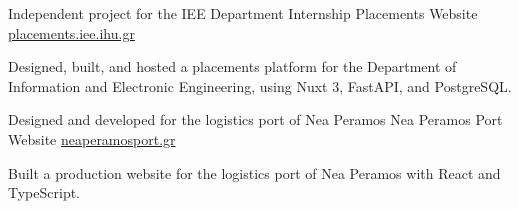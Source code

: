 

\begin{cventries}

  \cventry
    {Independent project for the IEE Department} %
    {Internship Placements Website} %
    {\href{https://placements.iee.ihu.gr}{placements.iee.ihu.gr}} %
    {} %
    {
      \begin{cvitems}
        \item {Designed, built, and hosted a placements platform for the Department of Information and Electronic Engineering, using Nuxt 3, FastAPI, and PostgreSQL.}
      \end{cvitems}
    }

  \cventry
    {Designed and developed for the logistics port of Nea Peramos} %
    {Nea Peramos Port Website} %
    {\href{https://neaperamosport.gr}{neaperamosport.gr}} %
    {} %
    {
      \begin{cvitems}
        \item {Built a production website for the logistics port of Nea Peramos with React and TypeScript.}
      \end{cvitems}
    }

\end{cventries}
